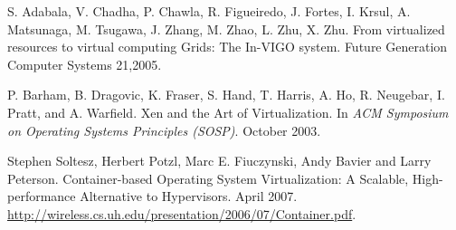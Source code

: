 \documentclass{sigplanconf}
\begin{document}
\begin{thebibliography}{99}
S. Adabala, V. Chadha, P. Chawla, R. Figueiredo, J. Fortes, I. Krsul,
A. Matsunaga, M. Tsugawa, J. Zhang, M. Zhao, L. Zhu, X. Zhu.
From virtualized resources to virtual computing Grids: The In-VIGO system. Future Generation
Computer Systems 21,2005.

P. Barham, B. Dragovic, K. Fraser, S.
Hand, T. Harris, A. Ho, R. Neugebar, I. Pratt, and A.
Warfield. Xen and the Art of Virtualization. In {\em ACM
Symposium on Operating Systems Principles (SOSP)}. October 2003.

Stephen Soltesz, Herbert Potzl, Marc E. Fiuczynski, Andy Bavier and Larry Peterson. Container-based
Operating System Virtualization: A Scalable, High-performance Alternative to Hypervisors. April 2007.
\url{http://wireless.cs.uh.edu/presentation/2006/07/Container.pdf}.

\end{thebibliography}
\end{document}
